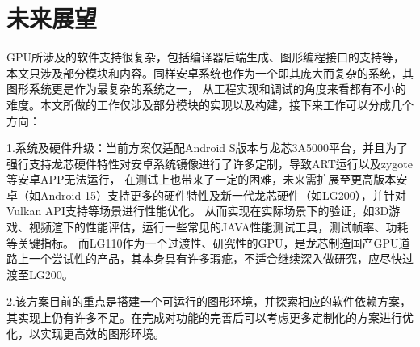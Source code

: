 
\section{未来展望}

GPU所涉及的软件支持很复杂，包括编译器后端生成、图形编程接口的支持等，本文只涉及部分模块和内容。同样安卓系统也作为一个即其庞大而复杂的系统，其图形系统更是作为最复杂的系统之一，
从工程实现和调试的角度来看都有不小的难度。本文所做的工作仅涉及部分模块的实现以及构建，接下来工作可以分成几个方向：

1.系统及硬件升级：当前方案仅适配Android S版本与龙芯3A5000平台，并且为了强行支持龙芯硬件特性对安卓系统镜像进行了许多定制，导致ART运行以及zygote等安卓APP无法运行，
在测试上也带来了一定的困难，未来需扩展至更高版本安卓（如Android 15）支持更多的硬件特性及新一代龙芯硬件（如LG200），并针对Vulkan API支持等场景进行性能优化。
从而实现在实际场景下的验证，如3D游戏、视频渲下的性能评估，运行一些常见的JAVA性能测试工具，测试帧率、功耗等关键指标。
而LG110作为一个过渡性、研究性的GPU，是龙芯制造国产GPU道路上一个尝试性的产品，其本身具有许多瑕疵，不适合继续深入做研究，应尽快过渡至LG200。

2.该方案目前的重点是搭建一个可运行的图形环境，并探索相应的软件依赖方案，其实现上仍有许多不足。在完成对功能的完善后可以考虑更多定制化的方案进行优化，以实现更高效的图形环境。

